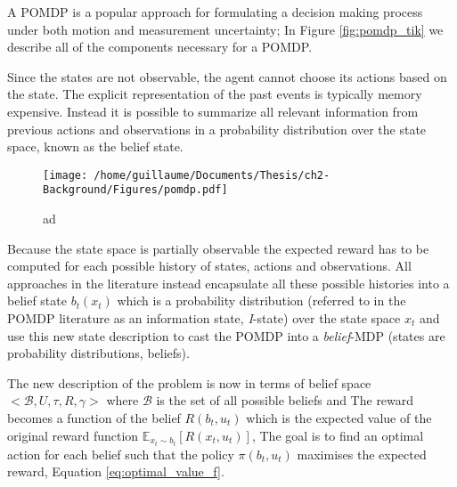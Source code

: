 
A POMDP is a popular approach for formulating a decision making process under both motion and measurement uncertainty;
In Figure \ref{fig:pomdp_tik} we describe all of the components necessary for a POMDP.

Since the states are not observable, the agent cannot choose its actions based on the state. The explicit 
representation of the past events is typically memory expensive. Instead it is possible to summarize all relevant 
information from previous actions and observations in a probability distribution over the state space, known as the
belief state. 

\begin{figure}[h]
 \centering
 \texttt{[image: /home/guillaume/Documents/Thesis/ch2-Background/Figures/pomdp.pdf]}
  \caption{ad}
\end{figure}


Because the state space is partially observable the expected reward has to be computed for each possible history of states, actions and observations.
All approaches in the literature instead encapsulate all these possible histories into a belief state $b_t(x_t)$ which is a 
probability distribution (referred to in the POMDP literature as an information state, \textit{I}-state) over the state space $x_t$ and use this 
new state description to cast the POMDP into a \textit{belief}-MDP (states are probability distributions, beliefs). 

The new description of the problem is now in terms of belief space $<\mathcal{B},U,\tau,R,\gamma>$ where $\mathcal{B}$ is the set of 
all possible beliefs and 
The reward becomes a function of the belief $R(b_t,u_t)$ which is the expected value of the original reward 
function $\mathbb{E}_{x_t \sim b_t}[R(x_t,u_t)]$, The goal is to find an optimal action for each belief such that 
the policy $\pi(b_t,u_t)$ maximises the expected reward, Equation \ref{eq:optimal_value_f}.

